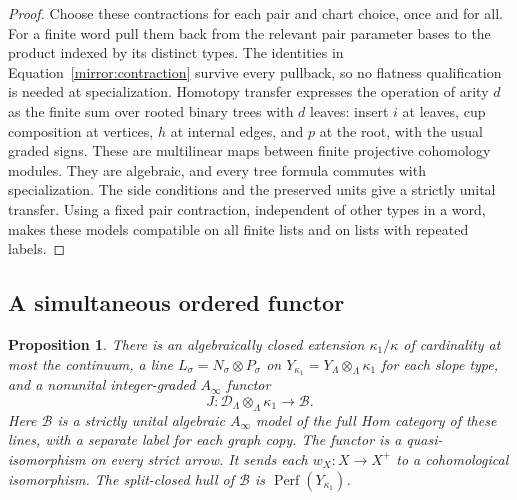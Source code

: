 \documentclass[11pt]{article}
\newtheorem{proposition}[theorem]{Proposition}
\theoremstyle{definition}
\theoremstyle{remark}
\newcommand{\Ainf}{A_\infty}
\DeclareMathOperator{\Perf}{Perf}
\numberwithin{equation}{section}
\begin{document}
\begin{proof}
Choose these contractions for each pair and chart choice, once and
for all.  For a finite word pull them back from the relevant pair
parameter bases to the product indexed by its distinct types.
The identities in Equation~\eqref{mirror:contraction} survive every
pullback, so no flatness qualification is needed at specialization.
Homotopy transfer expresses the operation of arity $d$ as the finite
sum over rooted binary trees with $d$ leaves: insert $i$ at leaves,
cup composition at vertices, $h$ at internal edges, and $p$ at the
root, with the usual graded signs.  These are multilinear maps
between finite projective cohomology modules.  They are algebraic,
and every tree formula commutes with specialization.  The side
conditions and the preserved units give a strictly unital transfer.
Using a fixed pair contraction, independent of other types in a
word, makes these models compatible on all finite lists and on
lists with repeated labels.
\end{proof}

\subsection{A simultaneous ordered functor}

\begin{proposition}
\label{mirror:simultaneous}
There is an algebraically closed extension $\kappa_1/\kappa$ of
cardinality at most the continuum, a line
$L_\sigma=N_\sigma\otimes P_\sigma$ on
$Y_{\kappa_1}=Y_\Lambda\otimes_\Lambda\kappa_1$ for each slope
type, and a nonunital integer-graded $\Ainf$ functor
\begin{equation}
 J:\mathcal D_\Lambda\otimes_\Lambda\kappa_1
             \longrightarrow\mathcal B.
 \label{mirror:simultaneous-functor}
\end{equation}
Here $\mathcal B$ is a strictly unital algebraic $\Ainf$ model of
the full Hom category of these lines, with a separate label for
each graph copy.  The functor is a quasi-isomorphism on every strict
arrow.  It sends each $w_X:X\to X^+$ to a cohomological
isomorphism.  The split-closed hull of $\mathcal B$ is
$\Perf(Y_{\kappa_1})$.
\end{proposition}
\end{document}
